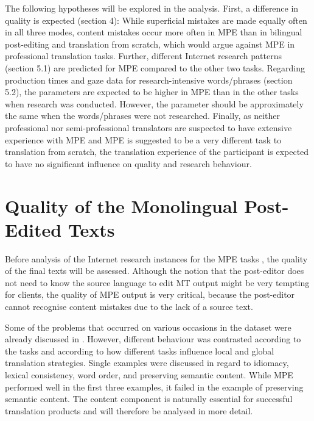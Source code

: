 \documentclass[output=paper]{langsci/langscibook}
\begin{document}
The following hypotheses will be explored in the analysis. First, a difference in quality is expected (section 4): While superficial mistakes are made equally often in all three modes, content mistakes occur more often in MPE than in bilingual post-editing and translation from scratch, which would argue against MPE in professional translation tasks. Further, different Internet research patterns (section 5.1) are predicted for MPE compared to the other two tasks. Regarding production times and gaze data for research-intensive words/phrases (section 5.2), the parameters are expected to be higher in MPE than in the other tasks when research was conducted. However, the parameter should be approximately the same when the words/phrases were not researched. Finally, as neither professional nor semi-professional translators are suspected to have extensive experience with MPE and MPE is suggested to be a very different task to translation from scratch, the translation experience of the participant is expected to have no significant influence on quality and research behaviour.


\section{Quality of the Monolingual Post-Edited Texts}

Before analysis of the Internet research instances for the MPE tasks , the quality of the final texts will be assessed. Although the notion that the post-editor does not need to know the source language to edit MT output might be very tempting for clients, the quality of MPE output is very critical, because the post-editor cannot recognise content mistakes due to the lack of a source text.


Some of the problems that occurred on various occasions in the dataset were already discussed in \citet{Culo2014}. However, different behaviour was contrasted according to the tasks and according to how different tasks influence local and global translation strategies. Single examples were discussed in regard to idiomacy, lexical consistency, word order, and preserving semantic content. While MPE performed well in the first three examples, it failed in the example of preserving semantic content. The content component is naturally essential for successful translation products and will therefore be analysed in more detail.
\end{document}
